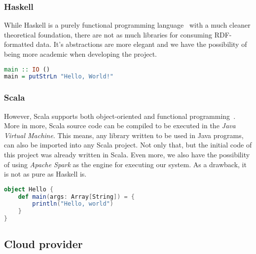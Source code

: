 \subsubsection{Haskell}

While Haskell is a purely functional programming language~\cite{wiki:Haskell} with a much cleaner theoretical foundation, there are not as much libraries for consuming RDF-formatted data. It's abstractions are more elegant and we have the possibility of being more academic when developing the project.

\begin{lstlisting}[language=Haskell, caption=\textit{Hello World!} program written in Haskell]
main :: IO ()
main = putStrLn "Hello, World!"
\end{lstlisting}

\subsubsection{Scala}

However, Scala supports both object-oriented and functional programming~\cite{wiki:Scala_(programming_language)}. More in more, Scala source code can be compiled to be executed in the \textit{Java Virtual Machine}. This means, any library written to be used in Java programs, can also be imported into any Scala project. Not only that, but the initial code of this project was already written in Scala. Even more, we also have the possibility of using \textit{Apache Spark} as the engine for executing our system. As a drawback, it is not as pure as Haskell is.

\begin{lstlisting}[language=Scala, caption=\textit{Hello World!} program written in Scala 2]
object Hello {
    def main(args: Array[String]) = {
        println("Hello, world")
    }
}
\end{lstlisting}

\subsection{Cloud provider}